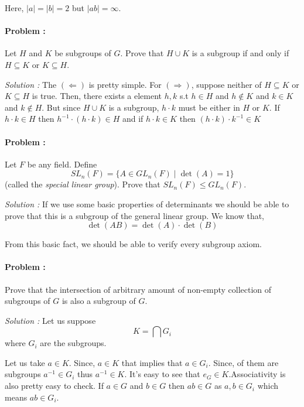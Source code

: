 Here, $|a|=|b|=2$ but $|ab|=\infty$.


\paragraph{Problem :} Let $H$ and $K$ be subgroups of $G$. Prove that $H \cup K$ is a subgroup if and only if $H \subseteq K$ or 
$K \subseteq H$.

\vspace{4mm}
\textit{Solution :}
The $(\Leftarrow)$ is pretty simple. For $(\Rightarrow)$, suppose neither of $H \subseteq K$ or 
$K \subseteq H$ is true. Then, there exists a element $h,k$  s.t $h \in H$ and $h \not \in K$ and $k \in K$ and $k \not \in H$.
But since $H \cup K$ is a subgroup, $h\cdot k$ must be either in $H$ or $K$. If $h \cdot k \in H$ then $h^{-1} \cdot (h \cdot k) \in H$
and if $h \cdot k \in K$ then $(h \cdot k) \cdot k^{-1} \in K$

\paragraph{Problem :} Let $F$ be any field. Define 
\[ SL_n(F) = \{ A \in GL_n(F) \mid \det(A)=1 \} \]
(called the \textit{special linear group}). Prove that $SL_n(F) \le GL_n(F)$.

\vspace{4mm}    
\textit{Solution :} If we use some basic properties of determinants we should be able to prove that this is a subgroup of the general linear group.
We know that,
\[ \det(A B) = \det(A) \cdot \det(B)\]

From this basic fact, we should be able to verify every subgroup axiom.

\paragraph{Problem :} Prove that the intersection of arbitrary amount of non-empty collection of subgroups of $G$ is also a subgroup of $G$.


\vspace{4mm}
\textit{Solution :} Let us suppose 
\[ K = \bigcap G_i \]
where $G_i$ are the subgroups. 

Let us take $a \in K$. Since, $a \in K$ that implies that $a \in G_i$. Since, of them are subgroups $a^{-1} \in G_i$ thus $a^{-1} \in K$.
It's easy to see that $e_G \in K$.Associativity is also pretty easy to check. If $a \in G$ and $b \in G$ then $ab \in G$ as $a, b\in G_i$ which means $ab \in G_i$.

